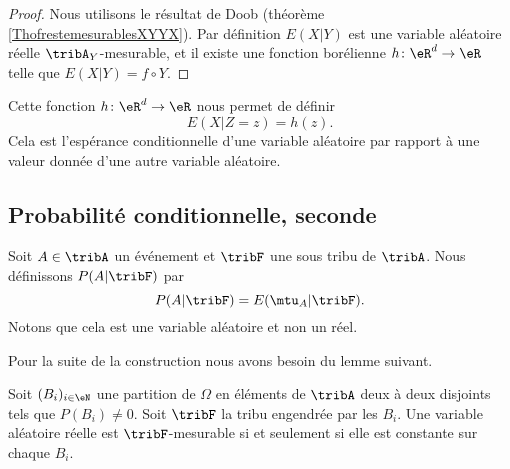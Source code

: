 \begin{proof}
    Nous utilisons le résultat de Doob (théorème \ref{ThofrestemesurablesXYYX}). Par définition \( E(X|Y)\) est une variable aléatoire réelle \( \tribA_Y\)-mesurable, et il existe une fonction borélienne \( h\colon \eR^d\to \eR\) telle que \( E(X|Y)=f\circ Y\).
\end{proof}

Cette fonction \( h\colon \eR^d\to \eR\) nous permet de définir
\begin{equation}
    E(X|Z=z)=h(z).
\end{equation}
Cela est l'espérance conditionnelle d'une variable aléatoire par rapport à une valeur donnée d'une autre variable aléatoire.

\subsection{Probabilité conditionnelle, seconde}

Soit \( A\in\tribA\) un événement et \( \tribF\) une sous tribu de \( \tribA\). Nous définissons \( P(A|\tribF)\) par
\begin{equation}
    P(A|\tribF)=E(\mtu_{A}|\tribF).
\end{equation}
Notons que cela est une variable aléatoire et non un réel.

Pour la suite de la construction nous avons besoin du lemme suivant.
\begin{lemma}
    Soit \( (B_i)_{i\in\eN}\) une partition de \( \Omega\) en éléments de \( \tribA\) deux à deux disjoints tels que \( P(B_i)\neq 0\). Soit \( \tribF\) la tribu engendrée par les \( B_i\). Une variable aléatoire réelle est \( \tribF\)-mesurable si et seulement si elle est constante sur chaque \( B_i\).
\end{lemma}

